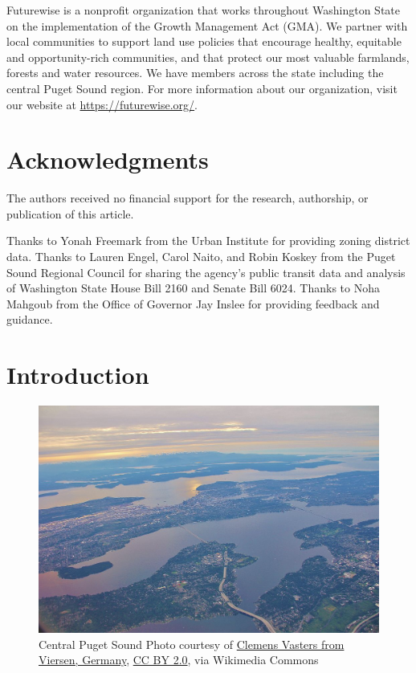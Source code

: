\documentclass[
]{agujournal2019}
\begin{document}
Futurewise is a nonprofit organization that works throughout Washington
State on the implementation of the Growth Management Act (GMA). We
partner with local communities to support land use policies that
encourage healthy, equitable and opportunity-rich communities, and that
protect our most valuable farmlands, forests and water resources. We
have members across the state including the central Puget Sound region.
For more information about our organization, visit our website at
\url{https://futurewise.org/}.

\section*{Acknowledgments}\label{acknowledgments}

The authors received no financial support for the research, authorship,
or publication of this article.

Thanks to Yonah Freemark from the Urban Institute for providing zoning
district data. Thanks to Lauren Engel, Carol Naito, and Robin Koskey
from the Puget Sound Regional Council for sharing the agency's public
transit data and analysis of Washington State House Bill 2160 and Senate
Bill 6024. Thanks to Noha Mahgoub from the Office of Governor Jay Inslee
for providing feedback and guidance.

\section{Introduction}\label{introduction}

\begin{figure}[H]

{\centering \includegraphics{images/seattle-aerial-wikicommons.jpg}

}

\caption{Central Puget Sound \textbar{} Photo courtesy of
\hyperref[0]{Clemens Vasters from Viersen, Germany}, \hyperref[0]{CC BY
2.0}, via Wikimedia Commons}

\end{figure}%
\end{document}
